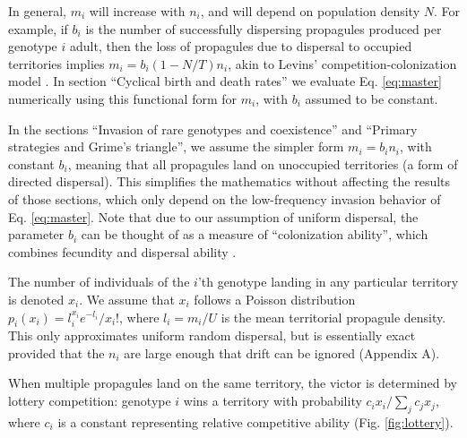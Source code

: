 \documentclass[11pt]{article}
\begin{document}
In general, $m_i$ will increase with $n_i$, and will depend on population density $N$. For example, if $b_i$ is the number of successfully dispersing propagules produced per genotype $i$ adult, then the loss of propagules due to dispersal to occupied territories implies $m_i=b_i(1-N/T)n_i$, akin to Levins' competition-colonization model \citep{levins_71,tilman_94}. In section ``Cyclical birth and death rates'' we evaluate Eq. \eqref{eq:master} numerically using this functional form for $m_i$, with $b_i$ assumed to be constant. 

In the sections ``Invasion of rare genotypes and coexistence'' and ``Primary strategies and Grime's triangle'', we assume the simpler form $m_i=b_i n_i$, with constant $b_i$, meaning that all propagules land on unoccupied territories (a form of directed dispersal). This simplifies the mathematics without affecting the results of those sections, which only depend on the low-frequency invasion behavior of Eq. \eqref{eq:master}. Note that due to our assumption of uniform dispersal, the parameter $b_i$ can be thought of as a measure of ``colonization ability'', which combines fecundity and dispersal ability \citep{levins_71,tilman_94,bolker_99}. 

The number of individuals of the $i$'th genotype landing in any particular territory is denoted $x_i$. We assume that $x_i$ follows a Poisson distribution $p_i(x_i)=l_i^{x_i} e^{-l_i}/x_i!$, where $l_i=m_i/U$ is the mean territorial propagule density. This only approximates uniform random dispersal, but is essentially exact provided that the $n_i$ are large enough that drift can be ignored (Appendix A).

When multiple propagules land on the same territory, the victor is determined by lottery competition: genotype $i$ wins a territory with probability $c_i x_i/\sum_j c_j x_j$, where $c_i$ is a constant representing relative competitive ability (Fig. \ref{fig:lottery}). 
\end{document}
